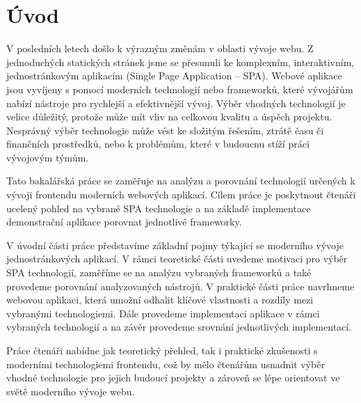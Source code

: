 \section*{Úvod}

\begin{zvyraznenyodstavec}
V posledních letech došlo k výrazným změnám v oblasti vývoje webu. 
Z jednoduchých statických stránek jsme se přesunuli ke komplexním, interaktivním, jednostránkovým aplikacím (Single Page Application -- SPA). 
Webové aplikace jsou vyvíjeny s pomocí moderních technologií nebo frameworků, které vývojářům nabízí nástroje pro rychlejší a efektivnější vývoj. 
Výběr vhodných technologií je velice důležitý, protože může mít vliv na celkovou kvalitu a úspěch projektu. 
Nesprávný výběr technologie může vést ke složitým řešením, ztrátě času či finančních prostředků, nebo k problémům, které v budoucnu stíží práci vývojovým týmům.

Tato bakalářská práce se zaměřuje na analýzu a porovnání technologií určených k vývoji frontendu moderních webových aplikací. 
Cílem práce je poskytnout čtenáři ucelený pohled na vybrané SPA technologie a na základě implementace demonstrační aplikace porovnat jednotlivé frameworky.

V úvodní části práce představíme základní pojmy týkající se moderního vývoje jednostránkových aplikací. 
V rámci teoretické části uvedeme motivaci pro výběr SPA technologií, zaměříme se na analýzu vybraných frameworků a také provedeme porovnání analyzovaných nástrojů. 
V praktické části práce navrhneme webovou aplikaci, která umožní odhalit klíčové vlastnosti a rozdíly mezi vybranými technologiemi. 
Dále provedeme implementaci aplikace v rámci vybraných technologií a na závěr provedeme srovnání jednotlivých implementací.

Práce čtenáři nabídne jak teoretický přehled, tak i praktické zkušenosti s moderními technologiemi frontendu, 
což by mělo čtenářům usnadnit výběr vhodné technologie pro jejich budoucí projekty a zároveň se lépe orientovat ve světě moderního vývoje webu.
\end{zvyraznenyodstavec}


